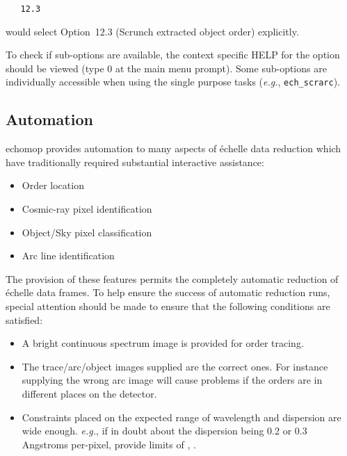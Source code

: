 \begin{verbatim}
   12.3
\end{verbatim}

would select Option~12.3 (Scrunch extracted object order) explicitly.

To check if sub-options are available, the context specific HELP for the
option should be viewed (type 0 at the main menu prompt). Some
sub-options are individually accessible when using the single purpose
tasks ({\it{e.g.}}, \verb+ech_scrarc+).


\subsection{Automation}

{\sc echomop} provides automation to many aspects of \'{e}chelle data reduction
which have traditionally required substantial interactive assistance:

\begin{itemize}

\item Order location
\item Cosmic-ray pixel identification
\item Object/Sky pixel classification
\item Arc line identification

\end{itemize}

The provision of these features permits the completely automatic
reduction of \'{e}chelle data frames.  To help ensure the success of
automatic reduction runs, special attention should be made to ensure
that the following conditions are satisfied:

\begin{itemize}

\item A bright continuous spectrum image is provided for order
      tracing.

\item The trace/arc/object images supplied are the correct ones. For
      instance supplying the wrong arc image will cause problems if the
      orders are in different places on the detector.

\item Constraints placed on the expected range of wavelength and
      dispersion are wide enough. {\it{e.g.}}, if in doubt about the
      dispersion being 0.2 or 0.3 Angstroms per-pixel, provide limits of
      ,
      .

\end{itemize}


